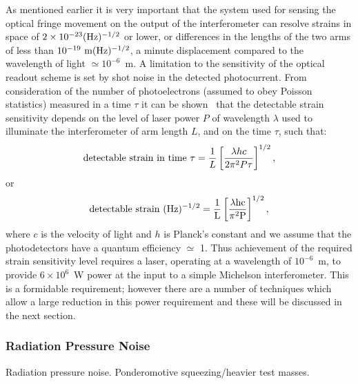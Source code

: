 \documentclass{article}
\begin{document}
As mentioned earlier it is very important that the system used for
sensing the optical fringe movement on the output of the
interferometer can resolve strains in space of $2 \times
10^{-23}(\rm Hz)^{-1/2}$ or lower, or differences in the lengths of the
two arms of less than $10^{-19}{\rm \ m(\rm Hz)^{-1/2}}$, a minute
displacement compared to the wavelength of light $\simeq 10^{-6}$~m. A
limitation to the sensitivity of the optical readout scheme is set by
shot noise in the detected photocurrent. From consideration of the
number of photoelectrons (assumed to obey Poisson statistics) measured
in a time $\tau$ it can be shown~\cite{HoughMG5} that the detectable
strain sensitivity depends on the level of laser power $P$ of
wavelength $\lambda$ used to illuminate the interferometer of arm
length $L$, and on the time $\tau$, such that:
%
\begin{equation}
  {\rm detectable\ strain\ in\ time\ } \tau = \frac 1{L}\left[\frac{\lambda h
  c}{2 \pi^{2} P \tau}\right]^{1/2},
  \label{equation:shot1}
\end{equation}
%
or
%
\begin{equation}
  {\rm detectable\ strain\ }(\rm Hz)^{-1/2} = \frac
  1{L}\left[\frac{\lambda h c}{\pi^{2} P }\right]^{1/2},
  \label{equation:shot2}
\end{equation}
%
where $c$ is the velocity of light and $h$ is Planck's constant and we
assume that the photodetectors have a quantum efficiency $\simeq$
1. Thus achievement of the required strain sensitivity level requires
a laser, operating at a wavelength of $10^{-6}$~m, to provide $6
\times 10^{6}$~W power at the input to a simple Michelson
interferometer. This is a formidable requirement; however there are a
number of techniques which allow a large reduction in this power
requirement and these will be discussed in the next section.


\subsubsection{Radiation Pressure Noise}
\label{subsubsection:radiationnoise}

Radiation pressure noise.  Ponderomotive squeezing/heavier test masses.

\end{document}
